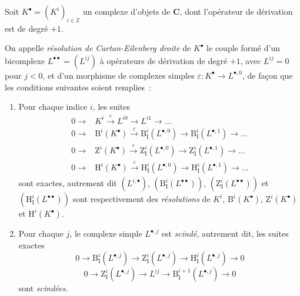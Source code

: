 \begin{env}[11.4.2]
\label{0.11.4.2-fr}
Soit $K^\bullet=(K^i)_{i\in\mathbb Z}$ un complexe d'objets de $\boldsymbol{C}$,
dont l'opérateur de dérivation est de degré $+1$.

On appelle \emph{résolution de Cartan-Eilenberg droite} de $K^\bullet$ le
couple formé d'un bicomplexe $L^{\bullet\bullet}=(L^{ij})$ à opérateurs de
dérivation de degré $+1$, avec $L^{ij}=0$ pour $j<0$, et d'un morphisme de
complexes simples $\varepsilon:K^\bullet\to L^{\bullet,0}$, de façon que les
conditions suivantes soient remplies~:
\begin{enumerate}
  \item[(i)] Pour chaque indice $i$, les suites
    \[
    \begin{aligned}
      0\longrightarrow{}&K^i\xrightarrow{\varepsilon}L^{i0}
        \longrightarrow L^{i1}\longrightarrow\ldots\\
      0\longrightarrow{}&\mathrm B^i(K^\bullet)\xrightarrow{\varepsilon}
        \mathrm B_{\mathrm I}^i(L^{\bullet,0})
        \longrightarrow\mathrm B_{\mathrm I}^i(L^{\bullet,1})
        \longrightarrow\ldots\\
      0\longrightarrow{}&\mathrm Z^i(K^\bullet)\xrightarrow{\varepsilon}
        \mathrm Z_{\mathrm I}^i(L^{\bullet,0})
        \longrightarrow\mathrm Z_{\mathrm I}^i(L^{\bullet,1})
        \longrightarrow\ldots\\
      0\longrightarrow{}&\mathrm H^i(K^\bullet)\xrightarrow{\varepsilon}
        \mathrm H_{\mathrm I}^i(L^{\bullet,0})
        \longrightarrow\mathrm H_{\mathrm I}^i(L^{\bullet,1})
        \longrightarrow\ldots
    \end{aligned}
    \]
    sont exactes, autrement dit $(L^{i,\bullet})$,
    $(\mathrm B_{\mathrm I}^i(L^{\bullet\bullet}))$,
    $(\mathrm Z_{\mathrm I}^i(L^{\bullet\bullet}))$ et
    $(\mathrm H_{\mathrm I}^i(L^{\bullet\bullet}))$ sont respectivement
    des \emph{résolutions} de $K^i$, $\mathrm B^i(K^\bullet)$,
    $\mathrm Z^i(K^\bullet)$ et $\mathrm H^i(K^\bullet)$.
  \item[(ii)] Pour chaque $j$, le complexe simple $L^{\bullet,j}$ est
    \emph{scindé}, autrement dit, les suites exactes
    \[
      \label{0.11.4.2.1-fr}
      0\longrightarrow\mathrm B_{\mathrm I}^i(L^{\bullet,j})
      \longrightarrow\mathrm Z_{\mathrm I}^i(L^{\bullet,j})
      \longrightarrow\mathrm H_{\mathrm I}^i(L^{\bullet,j})
      \longrightarrow0
      \tag{11.4.2.1}
    \]
    \[
      \label{0.11.4.2.2-fr}
      0\longrightarrow\mathrm Z_{\mathrm I}^i(L^{\bullet,j})
      \longrightarrow L^{ij}
      \longrightarrow\mathrm B_{\mathrm I}^{i+1}(L^{\bullet,j})
      \longrightarrow0
      \tag{11.4.2.2}
    \]
    sont \emph{scindées}.
\end{enumerate}


\end{env}
